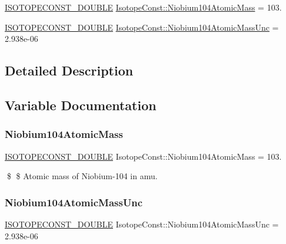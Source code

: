 \begin{DoxyCompactItemize}
\item 
\mbox{\hyperlink{group___isotope_const-_macros_ga8f45a7272ce02c0b4c65c44636ed719a}{I\+S\+O\+T\+O\+P\+E\+C\+O\+N\+S\+T\+\_\+\+D\+O\+U\+B\+LE}} \mbox{\hyperlink{group___isotope_const-_niobium-_nb104_gade3152d472f0107d11040c33be62c5e9}{Isotope\+Const\+::\+Niobium104\+Atomic\+Mass}} = 103.
\item 
\mbox{\hyperlink{group___isotope_const-_macros_ga8f45a7272ce02c0b4c65c44636ed719a}{I\+S\+O\+T\+O\+P\+E\+C\+O\+N\+S\+T\+\_\+\+D\+O\+U\+B\+LE}} \mbox{\hyperlink{group___isotope_const-_niobium-_nb104_gadfc1d4f935e7d8b655d20128d503426d}{Isotope\+Const\+::\+Niobium104\+Atomic\+Mass\+Unc}} = 2.\+938e-\/06
\end{DoxyCompactItemize}


\subsection{Detailed Description}


\subsection{Variable Documentation}
\mbox{\label{group___isotope_const-_niobium-_nb104_gade3152d472f0107d11040c33be62c5e9}} 
\subsubsection{\texorpdfstring{Niobium104\+Atomic\+Mass}{Niobium104AtomicMass}}
{\footnotesize\ttfamily \mbox{\hyperlink{group___isotope_const-_macros_ga8f45a7272ce02c0b4c65c44636ed719a}{I\+S\+O\+T\+O\+P\+E\+C\+O\+N\+S\+T\+\_\+\+D\+O\+U\+B\+LE}} Isotope\+Const\+::\+Niobium104\+Atomic\+Mass = 103.}

\$ \$ Atomic mass of Niobium-\/104 in amu. \mbox{\label{group___isotope_const-_niobium-_nb104_gadfc1d4f935e7d8b655d20128d503426d}} 
\subsubsection{\texorpdfstring{Niobium104\+Atomic\+Mass\+Unc}{Niobium104AtomicMassUnc}}
{\footnotesize\ttfamily \mbox{\hyperlink{group___isotope_const-_macros_ga8f45a7272ce02c0b4c65c44636ed719a}{I\+S\+O\+T\+O\+P\+E\+C\+O\+N\+S\+T\+\_\+\+D\+O\+U\+B\+LE}} Isotope\+Const\+::\+Niobium104\+Atomic\+Mass\+Unc = 2.\+938e-\/06}

